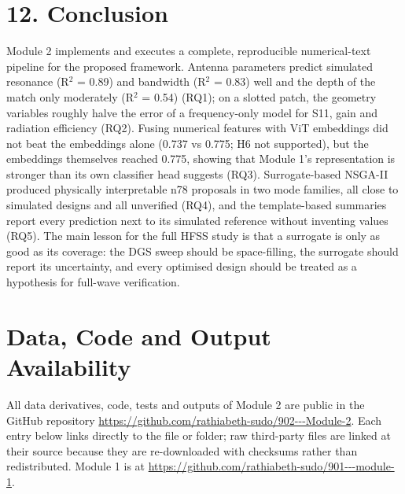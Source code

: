 \documentclass[11pt,a4paper]{article}
\begin{document}
\section*{12. Conclusion}
Module 2 implements and executes a complete, reproducible numerical-text pipeline for the proposed framework. Antenna parameters predict simulated resonance (R$^2$ = 0.89) and bandwidth (R$^2$ = 0.83) well and the depth of the match only moderately (R$^2$ = 0.54) (RQ1); on a slotted patch, the geometry variables roughly halve the error of a frequency-only model for S11, gain and radiation efficiency (RQ2). Fusing numerical features with ViT embeddings did not beat the embeddings alone (0.737 vs 0.775; H6 not supported), but the embeddings themselves reached 0.775, showing that Module 1's representation is stronger than its own classifier head suggests (RQ3). Surrogate-based NSGA-II produced physically interpretable n78 proposals in two mode families, all close to simulated designs and all unverified (RQ4), and the template-based summaries report every prediction next to its simulated reference without inventing values (RQ5). The main lesson for the full HFSS study is that a surrogate is only as good as its coverage: the DGS sweep should be space-filling, the surrogate should report its uncertainty, and every optimised design should be treated as a hypothesis for full-wave verification.

\section*{Data, Code and Output Availability}
All data derivatives, code, tests and outputs of Module 2 are public in the GitHub repository \url{https://github.com/rathiabeth-sudo/902---Module-2}. Each entry below links directly to the file or folder; raw third-party files are linked at their source because they are re-downloaded with checksums rather than redistributed. Module 1 is at \url{https://github.com/rathiabeth-sudo/901---module-1}.
\end{document}
